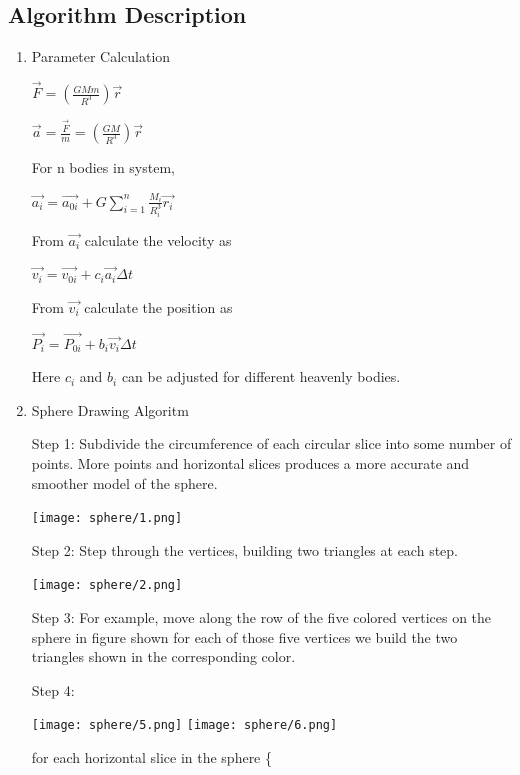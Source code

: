 \documentclass[12pt]{article}
\begin{document}
\subsection{Algorithm Description}
\begin{enumerate}
	\item Parameter Calculation
	
	\qquad$\vec{F} = (\frac{GMm}{R^{3}})\vec{r}$
	
	\qquad$\vec{a} = \frac{\vec{F}}{m} = (\frac{GM}{R^{3}})\vec{r}$
	
	For n bodies in system,
	
	\qquad$\vec{a_{i}} = \vec{a_{0i}} + G \sum_{i=1}^{n} \frac{M_{i}}{R_{i}^{3}} \vec{r_{i}} $	
	
	From $\vec{a_{i}}$ calculate the velocity as
	
	\qquad$\vec{v_{i}} = \vec{v_{0i}} + c_{i}\vec{a_{i}} \Delta t$
	
	From ${\vec{v_{i}}}$ calculate the position as
	
	\qquad$\vec{P_{i}} = \vec{P_{0i}} + b_{i} \vec{v_{i}} \Delta t$
	
	Here $c_{i}$ and $b_{i}$ can be adjusted for different heavenly bodies.
	
	\item Sphere Drawing Algoritm
	
	Step 1: Subdivide the circumference of each circular slice into some number of points. More points and horizontal slices produces a more accurate and smoother model of the sphere.
	
	\begin{center}
	\texttt{[image: sphere/1.png]}
	\end{center}

	Step 2: Step through the vertices, building two triangles at each step.
	
	\begin{center}
	\texttt{[image: sphere/2.png]}
	\end{center}
		
	Step 3: For example, move along the row of the five colored vertices on the sphere in figure shown for each of those five vertices we build the two triangles shown in the corresponding color.
				
	Step 4: 
	
	\begin{center}
	\texttt{[image: sphere/5.png]}
	\texttt{[image: sphere/6.png]}
	\end{center}
	
	for each horizontal slice in the sphere \{
	

\end{enumerate}
\end{document}
